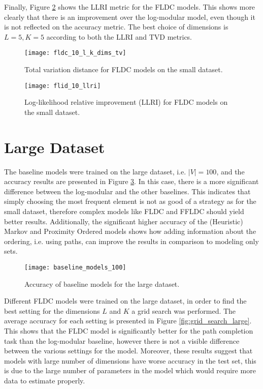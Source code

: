 Finally, Figure \ref{fig:small_llri} shows the LLRI metric for the FLDC models. This shows more clearly that there is an improvement over the log-modular model, even though it is not reflected on the accuracy metric. The best choice of dimensions is $L=5,K=5$ according to both the LLRI and TVD metrics.

\begin{figure}
  \centering
  \texttt{[image: fldc\_10\_l\_k\_dims\_tv]}
  \caption{Total variation distance for FLDC models on the small dataset.}
  \label{fig:small_tv_comparison}
\end{figure}

\begin{figure}
  \centering
  \texttt{[image: flid\_10\_llri]}
  \caption{Log-likelihood relative improvement (LLRI) for FLDC models on the small dataset.}
  \label{fig:small_llri}
\end{figure}

\section{Large Dataset}

The baseline models were trained on the large dataset, i.e. $|V| = 100$, and the accuracy results are presented in Figure \ref{fig:large_baselines}. In this case, there is a more significant difference between the log-modular and the other baselines. This indicates that simply choosing the most frequent element is not as good of a strategy as for the small dataset, therefore complex models like FLDC and FFLDC should yield better results. Additionally, the significant higher accuracy of the (Heuristic) Markov and Proximity Ordered models shows how adding information about the ordering, i.e. using paths, can improve the results in comparison to modeling only sets.

\begin{figure}
  \centering
  \texttt{[image: baseline\_models\_100]}
  \caption{Accuracy of baseline models for the large dataset.}
  \label{fig:large_baselines}
\end{figure}

Different FLDC models were trained on the large dataset, in order to find the best setting for the dimensions $L$ and $K$ a grid search was performed. The average accuracy for each setting is presented in Figure \ref{fig:grid_search_large}. This shows that the FLDC model is significantly better for the path completion task than the log-modular baseline, however there is not a visible difference between the various settings for the model. Moreover, these results suggest that models with large number of dimensions have worse accuracy in the test set, this is due to the large number of parameters in the model which would require more data to estimate properly.

